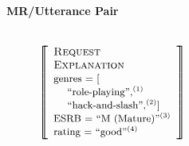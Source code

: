 \begin{figure}

%
%
%




{

    \centering
       
    \textbf{MR/Utterance Pair}\\

    ~\\

    \begin{subfigure}{0.26\textwidth}
        $\MR{\begin{array}{l}  
            \DA{Request} \\ 
            \DA{Explanation} \\
            \textrm{\footnotesize genres = [}\\
            \textrm{\footnotesize~~~~``role-playing'',\textsuperscript{(1)}} \\
            \textrm{\footnotesize~~~~``hack-and-slash'',\textsuperscript{(2)}]} \\
            \textrm{\footnotesize ESRB = ``M (Mature)''\textsuperscript{(3)}}\\
            \textrm{\footnotesize rating = ``good''\textsuperscript{(4)}} \\ 
        \end{array}}$


\end{subfigure}}
\end{figure}
